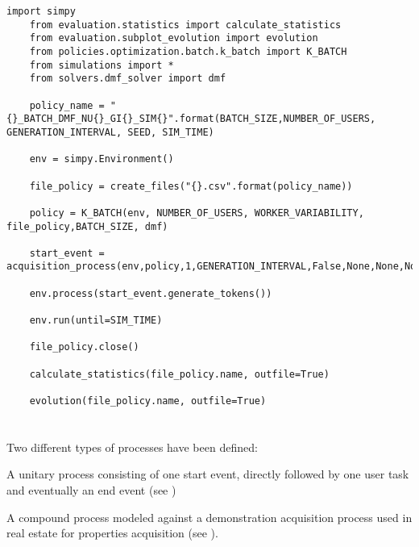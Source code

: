 \begin{lstlisting}[caption=Example of the structure of a simulation script. Here for the K-Batch policy using the \gls{dmf} formulation,label=lst:simulation_script,style=CustomPython]
	import simpy
	from evaluation.statistics import calculate_statistics
	from evaluation.subplot_evolution import evolution
	from policies.optimization.batch.k_batch import K_BATCH
	from simulations import *
	from solvers.dmf_solver import dmf

	policy_name = "{}_BATCH_DMF_NU{}_GI{}_SIM{}".format(BATCH_SIZE,NUMBER_OF_USERS, GENERATION_INTERVAL, SEED, SIM_TIME)

	env = simpy.Environment()

	file_policy = create_files("{}.csv".format(policy_name))

	policy = K_BATCH(env, NUMBER_OF_USERS, WORKER_VARIABILITY, file_policy,BATCH_SIZE, dmf)

	start_event = acquisition_process(env,policy,1,GENERATION_INTERVAL,False,None,None,None)

	env.process(start_event.generate_tokens())

	env.run(until=SIM_TIME)

	file_policy.close()

	calculate_statistics(file_policy.name, outfile=True)

	evolution(file_policy.name, outfile=True)
\end{lstlisting}

\section{}

Two different types of processes have been defined:
\begin{enumerate*}
	\item A unitary process consisting of one start event, directly followed by one user task and eventually an end event (see )
	\item A compound process modeled against a demonstration acquisition process used in real estate for properties acquisition (see ).
\end{enumerate*}



